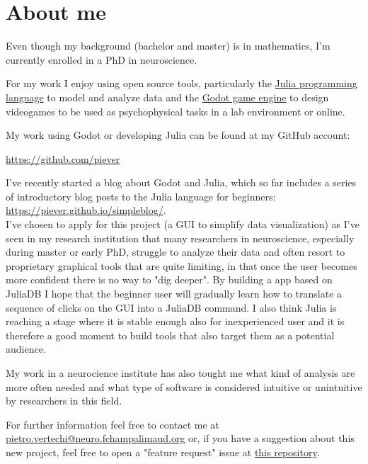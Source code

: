 \documentclass[10pt,a4paper]{report}
\begin{document}
\section*{About me}

Even though my background (bachelor and master) is in mathematics, I'm currently enrolled in a PhD in neuroscience.

For my work I enjoy using open source tools, particularly the \href{https://julialang.org/}{Julia programming language} to model and analyze data and the \href{https://godotengine.org/}{Godot game engine} to design videogames to be used as psychophysical tasks in a lab environment or online.

My work using Godot or developing Julia can be found at my GitHub account:

\url{https://github.com/piever}

I've recently started a blog about Godot and Julia, which so far includes a series of introductory blog posts to the Julia language for beginners: \url{https://piever.github.io/simpleblog/}. \\

I've chosen to apply for this project (a GUI to simplify data visualization) as I've seen in my research institution that many researchers in neuroscience, especially during master or early PhD, struggle to analyze their data and often resort to proprietary graphical tools that are quite limiting, in that once the user becomes more confident there is no way to "dig deeper". By building a app based on JuliaDB I hope that the beginner user will gradually learn how to translate a sequence of clicks on the GUI into a JuliaDB command. I also think Julia is reaching a stage where it is stable enough also for inexperienced user and it is therefore a good moment to build tools that also target them as a potential audience.

My work in a neurocience institute has also tought me what kind of analysis are more often needed and what type of software is considered intuitive or unintuitive by researchers in this field.

For further information feel free to contact me at \href{mailto:pietro.vertechi@neuro.fchampalimaud.org}{pietro.vertechi@neuro.fchampalimaud.org} or, if you have a suggestion about this new project, feel free to open a "feature request" issue at \href{https://github.com/piever/Sputnik.jl}{this repository}.
\end{document}
